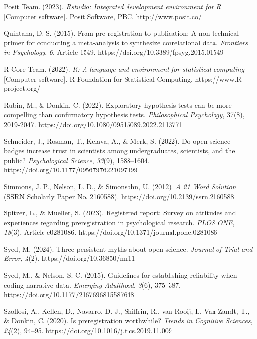 \documentclass[authordate, empirical]{jote-new-article}
\begin{document}
	Posit Team. (2023). \emph{Rstudio: Integrated development environment for R} [Computer software]. Posit Software, PBC. http://www.posit.co/



	Quintana, D. S. (2015). From pre-registration to publication: A non-technical primer for conducting a meta-analysis to synthesize correlational data. \emph{Frontiers in Psychology}, \emph{6}, Article 1549. https://doi.org/10.3389/fpsyg.2015.01549



	R Core Team. (2022). \emph{R: A language and environment for statistical computing} [Computer software]. R Foundation for Statistical Computing. https://www.R-project.org/



	Rubin, M., \& Donkin, C. (2022). Exploratory hypothesis tests can be more compelling than confirmatory hypothesis tests. \emph{Philosophical Psychology}, 37(8), 2019-2047. https://doi.org/10.1080/09515089.2022.2113771



	Schneider, J., Rosman, T., Kelava, A., \& Merk, S. (2022). Do open-science badges increase trust in scientists among undergraduates, scientists, and the public? \emph{Psychological Science}, \emph{33}(9), 1588--1604. https://doi.org/10.1177/09567976221097499



	Simmons, J. P., Nelson, L. D., \& Simonsohn, U. (2012). \emph{A 21 Word Solution} (SSRN Scholarly Paper No. 2160588). https://doi.org/10.2139/ssrn.2160588



	Spitzer, L., \& Mueller, S. (2023). Registered report: Survey on attitudes and experiences regarding preregistration in psychological research. \emph{PLOS ONE}, \emph{18}(3), Article e0281086. https://doi.org/10.1371/journal.pone.0281086



	Syed, M. (2024). Three persistent myths about open science. \emph{Journal of Trial and Error}, \emph{4}(2). https://doi.org/10.36850/mr11



	Syed, M., \& Nelson, S. C. (2015). Guidelines for establishing reliability when coding narrative data. \emph{Emerging Adulthood}, \emph{3}(6), 375--387. https://doi.org/10.1177/2167696815587648



	Szollosi, A., Kellen, D., Navarro, D. J., Shiffrin, R., van Rooij, I., Van Zandt, T., \& Donkin, C. (2020). Is preregistration worthwhile? \emph{Trends in Cognitive Sciences}, \emph{24}(2), 94--95. https://doi.org/10.1016/j.tics.2019.11.009
\end{document}
